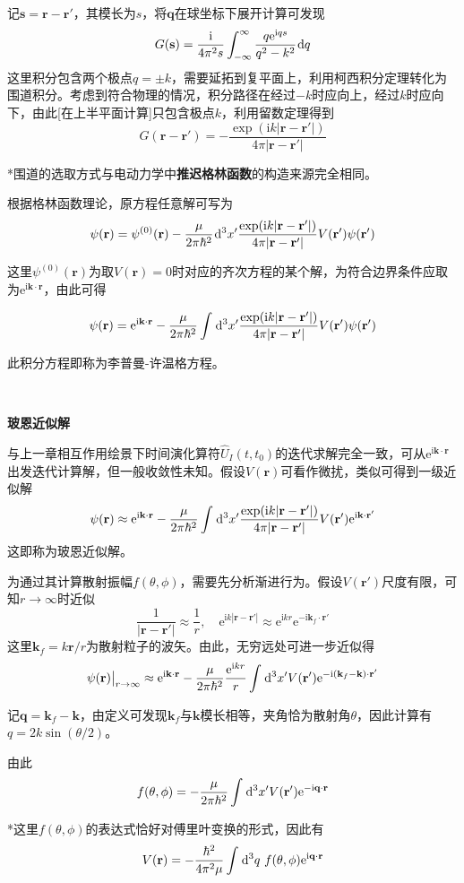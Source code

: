 \documentclass[a4paper,UTF8,fontset=windows]{ctexart}
\newcommand*{\dr}{\hspace{0.07em}\mathrm{d}}
\newcommand*{\ir}{\mathrm{i}}
\newcommand*{\er}{\mathrm{e}}
\newcommand*{\br}{\mathbf{r}}
\begin{document}
记$\mathbf{s}=\br-\br'$，其模长为$s$，将$\mathbf{q}$在球坐标下展开计算可发现
$$G(\mathbf{s})=\frac{\ir}{4\pi^2s}\int_{-\infty}^\infty\frac{q\er^{\ir qs}}{q^2-k^2}\dr q$$
这里积分包含两个极点$q=\pm k$，需要延拓到复平面上，利用柯西积分定理转化为围道积分。考虑到符合物理的情况，积分路径在经过$-k$时应向上，经过$k$时应向下，由此[在上半平面计算]只包含极点$k$，利用留数定理得到
$$G(\br-\br')=-\frac{\exp(\ir k|\br-\br'|)}{4\pi|\br-\br'|}$$

*围道的选取方式与电动力学中\textbf{推迟格林函数}的构造来源完全相同。

根据格林函数理论，原方程任意解可写为
$$\psi(\br)=\psi^{(0)}(\br)-\frac{\mu}{2\pi\hbar^2}\dr^3x'\frac{\exp(\ir k|\br-\br'|)}{4\pi|\br-\br'|}V(\br')\psi(\br')$$

这里$\psi^{(0)}(\br)$为取$V(\br)=0$时对应的齐次方程的某个解，为符合边界条件应取为$\er^{\ir\mathbf{k}\cdot\br}$，由此可得

$$\psi(\br)=\er^{\ir\mathbf{k}\cdot\br}-\frac{\mu}{2\pi\hbar^2}\int\dr^3x'\frac{\exp(\ir k|\br-\br'|)}{4\pi|\br-\br'|}V(\br')\psi(\br')$$

此积分方程即称为李普曼-许温格方程。

\

\textbf{玻恩近似解}

与上一章相互作用绘景下时间演化算符$\hat{U}_I(t,t_0)$的迭代求解完全一致，可从$\er^{\ir\mathbf{k}\cdot\br}$出发迭代计算解，但一般收敛性未知。假设$V(\br)$可看作微扰，类似可得到一级近似解
$$\psi(\br)\approx\er^{\ir\mathbf{k}\cdot\br}-\frac{\mu}{2\pi\hbar^2}\int\dr^3x'\frac{\exp(\ir k|\br-\br'|)}{4\pi|\br-\br'|}V(\br')\er^{\ir\mathbf{k}\cdot\br'}$$
这即称为玻恩近似解。

为通过其计算散射振幅$f(\theta,\phi)$，需要先分析渐进行为。假设$V(\br')$尺度有限，可知$r\to\infty$时近似
$$\frac{1}{|\br-\br'|}\approx\frac{1}{r},\quad\er^{\ir k|\br-\br'|}\approx\er^{\ir kr}\er^{-\ir\mathbf{k}_f\cdot\br'}$$
这里$\mathbf{k}_f=k\br/r$为散射粒子的波矢。由此，无穷远处可进一步近似得
$$\psi(\br)\big|_{r\to\infty}\approx\er^{\ir\mathbf{k}\cdot\br}-\frac{\mu}{2\pi\hbar^2}\frac{\er^{\ir kr}}{r}\int\dr^3x'V(\br')\er^{-\ir(\mathbf{k}_f-\mathbf{k})\cdot\br'}$$

记$\mathbf{q}=\mathbf{k}_f-\mathbf{k}$，由定义可发现$\mathbf{k}_f$与$\mathbf{k}$模长相等，夹角恰为散射角$\theta$，因此计算有$q=2k\sin(\theta/2)$。

由此
$$f(\theta,\phi)=-\frac{\mu}{2\pi\hbar^2}\int\dr^3x'V(\br')\er^{-\ir\mathbf{q}\cdot\br}$$

*这里$f(\theta,\phi)$的表达式恰好对傅里叶变换的形式，因此有
$$V(\br)=-\frac{\hbar^2}{4\pi^2\mu}\int\dr^3q\ f(\theta,\phi)\er^{\ir\mathbf{q}\cdot\br}$$
\end{document}
